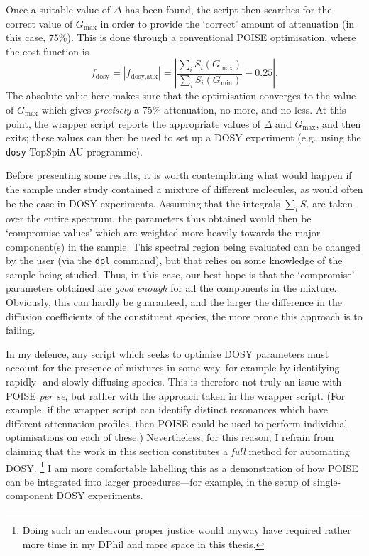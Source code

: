 Once a suitable value of $\Delta$ has been found, the script then searches for the correct value of $G_\text{max}$ in order to provide the `correct' amount of attenuation (in this case, 75\%).
This is done through a conventional POISE optimisation, where the cost function is
\begin{equation}
    \label{eq:dosy_cf}
    f_\text{dosy} = |f_\text{dosy,aux}| = \left| \frac{\sum_i S_i(G_\text{max})}{\sum_i S_i(G_\text{min})} - 0.25 \right|.
\end{equation}
The absolute value here makes sure that the optimisation converges to the value of $G_\text{max}$ which gives \textit{precisely} a 75\% attenuation, no more, and no less.
At this point, the wrapper script reports the appropriate values of $\Delta$ and $G_\text{max}$, and then exits; these values can then be used to set up a DOSY experiment (e.g.\ using the \texttt{dosy} TopSpin AU programme).

Before presenting some results, it is worth contemplating what would happen if the sample under study contained a mixture of different molecules, as would often be the case in DOSY experiments.
Assuming that the integrals $\sum_i S_i$ are taken over the entire spectrum, the parameters thus obtained would then be `compromise values' which are weighted more heavily towards the major component(s) in the sample.
This spectral region being evaluated can be changed by the user (via the \texttt{dpl} command), but that relies on some knowledge of the sample being studied.
Thus, in this case, our best hope is that the `compromise' parameters obtained are \textit{good enough} for all the components in the mixture.
Obviously, this can hardly be guaranteed, and the larger the difference in the diffusion coefficients of the constituent species, the more prone this approach is to failing.

In my defence, any script which seeks to optimise DOSY parameters must account for the presence of mixtures in some way, for example by identifying rapidly- and slowly-diffusing species.
This is therefore not truly an issue with POISE \textit{per se}, but rather with the approach taken in the wrapper script.
(For example, if the wrapper script can identify distinct resonances which have different attenuation profiles, then POISE could be used to perform individual optimisations on each of these.)
Nevertheless, for this reason, I refrain from claiming that the work in this section constitutes a \textit{full} method for automating DOSY.%
\footnote{Doing such an endeavour proper justice would anyway have required rather more time in my DPhil and more space in this thesis.}
I am more comfortable labelling this as a demonstration of how POISE can be integrated into larger procedures---for example, in the setup of single-component DOSY experiments.


